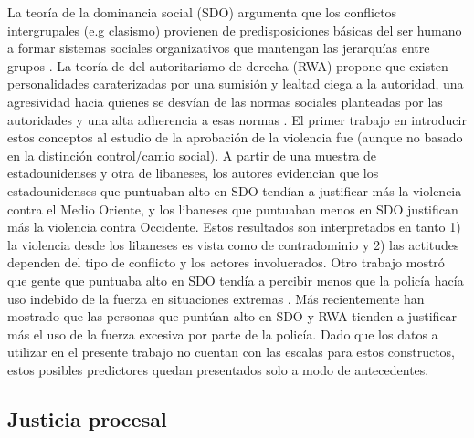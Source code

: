 \documentclass[12pt,twoside]{templates/facsothesis}
\begin{document}
La teoría de la dominancia social (SDO) argumenta que los conflictos intergrupales (e.g clasismo) provienen de predisposiciones básicas del ser humano a formar sistemas sociales organizativos que mantengan las jerarquías entre grupos \citep{Sidanius1999}. La teoría de del autoritarismo de derecha (RWA) propone que existen personalidades caraterizadas por una sumisión y lealtad ciega a la autoridad, una agresividad hacia quienes se desvían de las normas sociales planteadas por las autoridades y una alta adherencia a esas normas \citep{Altemeyer1988}. El primer trabajo en introducir estos conceptos al estudio de la aprobación de la violencia fue \citet{Henry2005} (aunque no basado en la distinción control/camio social). A partir de una muestra de estadounidenses y otra de libaneses, los autores evidencian que los estadounidenses que puntuaban alto en SDO tendían a justificar más la violencia contra el Medio Oriente, y los libaneses que puntuaban menos en SDO justifican más la violencia contra Occidente. Estos resultados son interpretados en tanto 1) la violencia desde los libaneses es vista como de contradominio y 2) las actitudes dependen del tipo de conflicto y los actores involucrados. Otro trabajo mostró que gente que puntuaba alto en SDO tendía a percibir menos que la policía hacía uso indebido de la fuerza en situaciones extremas \citep{Perkins2006}. Más recientemente \citet{Gerber2017b} han mostrado que las personas que puntúan alto en SDO y RWA tienden a justificar más el uso de la fuerza excesiva por parte de la policía. Dado que los datos a utilizar en el presente trabajo no cuentan con las escalas para estos constructos, estos posibles predictores quedan presentados solo a modo de antecedentes.

\hypertarget{justicia-procesal}{%
\subsection{Justicia procesal}\label{justicia-procesal}}
\end{document}

